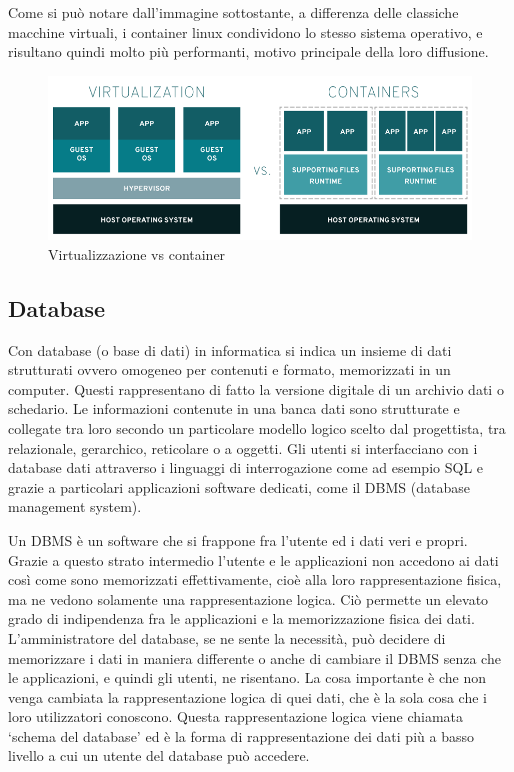 \documentclass[12pt,a4paper]{article}
\begin{document}
Come si può notare dall’immagine sottostante, a differenza delle classiche macchine virtuali, i container linux condividono lo stesso sistema operativo, e risultano quindi molto più performanti, motivo principale della loro diffusione.

\begin{figure}[H]
    \centering
    \includegraphics[width=.9\linewidth]{vm_docker.png}
    \caption{Virtualizzazione vs container}
\end{figure}


\subsection{Database}
Con database (o base di dati) in informatica si indica un insieme di dati strutturati ovvero omogeneo per contenuti e formato, memorizzati in un computer. Questi rappresentano di fatto la versione digitale di un archivio dati o schedario.
Le informazioni contenute in una banca dati sono strutturate e collegate tra loro secondo un particolare modello logico scelto dal progettista, tra relazionale, gerarchico, reticolare o a oggetti. Gli utenti si interfacciano con i database dati attraverso i linguaggi di interrogazione come ad esempio SQL e grazie a particolari applicazioni software dedicati, come il DBMS (database management system).

Un DBMS è un software che si frappone fra l’utente ed i dati veri e propri. Grazie a questo strato intermedio l’utente e le applicazioni non accedono ai dati così come sono memorizzati effettivamente, cioè alla loro rappresentazione fisica, ma ne vedono solamente una rappresentazione logica. Ciò permette un elevato grado di indipendenza fra le applicazioni e la memorizzazione fisica dei dati. L’amministratore del database, se ne sente la necessità, può decidere di memorizzare i dati in maniera differente o anche di cambiare il DBMS senza che le applicazioni, e quindi gli utenti, ne risentano. La cosa importante è che non venga cambiata la rappresentazione logica di quei dati, che è la sola cosa che i loro utilizzatori conoscono. Questa rappresentazione logica viene chiamata ‘schema del database’ ed è la forma di rappresentazione dei dati più a basso livello a cui un utente del database può accedere.
\end{document}
